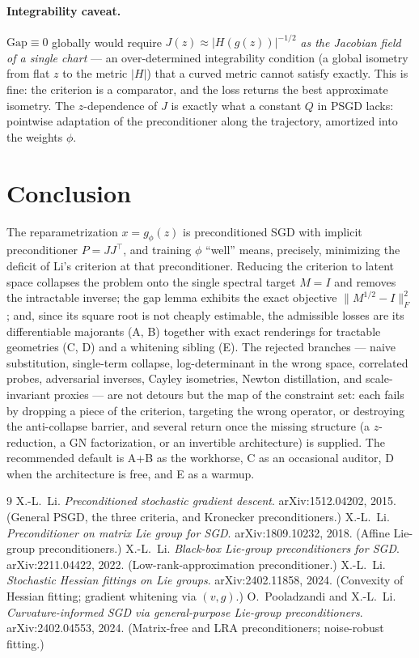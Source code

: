 \documentclass[11pt]{article}
\theoremstyle{plain}
\theoremstyle{definition}
\theoremstyle{remark}
\newcommand{\Fnorm}[1]{\lVert #1 \rVert_F}
\begin{document}
\paragraph{Integrability caveat.}
$\mathrm{Gap}\equiv0$ globally would require $J(z)\approx|H(g(z))|^{-1/2}$ \emph{as the
Jacobian field of a single chart} --- an over-determined integrability condition (a global
isometry from flat $z$ to the metric $|H|$) that a curved metric cannot satisfy exactly.
This is fine: the criterion is a comparator, and the loss returns the best approximate
isometry. The $z$-dependence of $J$ is exactly what a constant $Q$ in PSGD lacks: pointwise
adaptation of the preconditioner along the trajectory, amortized into the weights $\phi$.

\section{Conclusion}
The reparametrization $x=g_\phi(z)$ is preconditioned SGD with implicit preconditioner
$P=JJ^{\!\top}$, and training $\phi$ ``well'' means, precisely, minimizing the deficit of
Li's criterion at that preconditioner. Reducing the criterion to latent space collapses the
problem onto the single spectral target $M=I$ and removes the intractable inverse; the gap
lemma exhibits the exact objective $\Fnorm{M^{1/2}-I}^2$; and, since its square root is not
cheaply estimable, the admissible losses are its differentiable majorants (A, B) together
with exact renderings for tractable geometries (C, D) and a whitening sibling (E). The
rejected branches --- naive substitution, single-term collapse, log-determinant in the wrong
space, correlated probes, adversarial inverses, Cayley isometries, Newton distillation, and
scale-invariant proxies --- are not detours but the map of the constraint set: each fails by
dropping a piece of the criterion, targeting the wrong operator, or destroying the
anti-collapse barrier, and several return once the missing structure (a $z$-reduction, a GN
factorization, or an invertible architecture) is supplied. The recommended default is A+B as
the workhorse, C as an occasional auditor, D when the architecture is free, and E as a
warmup.

\begin{thebibliography}{9}
\small
{} X.-L.~Li. \emph{Preconditioned stochastic gradient descent}.
  arXiv:1512.04202, 2015. (General PSGD, the three criteria, and Kronecker preconditioners.)
 X.-L.~Li. \emph{Preconditioner on matrix Lie group for SGD}.
  arXiv:1809.10232, 2018. (Affine Lie-group preconditioners.)
 X.-L.~Li. \emph{Black-box Lie-group preconditioners for SGD}.
  arXiv:2211.04422, 2022. (Low-rank-approximation preconditioner.)
 X.-L.~Li. \emph{Stochastic Hessian fittings on Lie groups}.
  arXiv:2402.11858, 2024. (Convexity of Hessian fitting; gradient whitening via $(v,g)$.)
 O.~Pooladzandi and X.-L.~Li.
  \emph{Curvature-informed SGD via general-purpose Lie-group preconditioners}.
  arXiv:2402.04553, 2024. (Matrix-free and LRA preconditioners; noise-robust fitting.)
\end{thebibliography}
\end{document}
